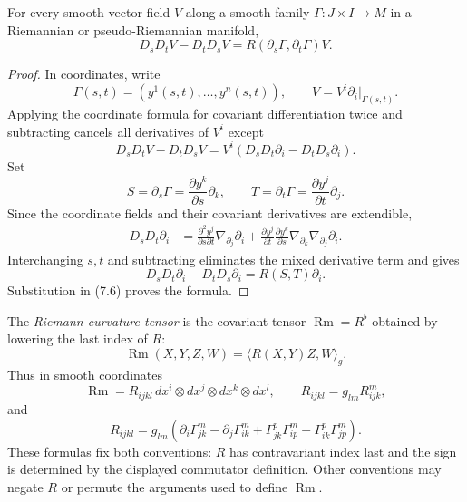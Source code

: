 \begin{proposition}
\label{prop:curvature-commutator-failure}

For every smooth vector field $V$ along a smooth family
$\Gamma\colon J\times I\to M$ in a Riemannian or pseudo-Riemannian manifold,
\[
D_sD_tV-D_tD_sV=R(\partial_s\Gamma,\partial_t\Gamma)V.
\]
\end{proposition}

\begin{proof}
\sketch In coordinates, write
\[
\Gamma(s,t)=(y^1(s,t),\ldots,y^n(s,t)),
\qquad V=V^i\partial_i|_{\Gamma(s,t)}.
\]
Applying the coordinate formula for covariant differentiation twice and
subtracting cancels all derivatives of $V^i$ except
\begin{equation}
D_sD_tV-D_tD_sV
=V^i(D_sD_t\partial_i-D_tD_s\partial_i). \tag{7.6}
\end{equation}
Set
\[
S=\partial_s\Gamma=\frac{\partial y^k}{\partial s}\partial_k,
\qquad
T=\partial_t\Gamma=\frac{\partial y^j}{\partial t}\partial_j.
\]
Since the coordinate fields and their covariant derivatives are extendible,
\begin{align*}
D_sD_t\partial_i
&=\frac{\partial^2y^j}{\partial s\partial t}
  \nabla_{\partial_j}\partial_i
 +\frac{\partial y^j}{\partial t}
  \frac{\partial y^k}{\partial s}
  \nabla_{\partial_k}\nabla_{\partial_j}\partial_i.
\end{align*}
Interchanging $s,t$ and subtracting eliminates the mixed derivative term and
gives
\[
D_sD_t\partial_i-D_tD_s\partial_i
=R(S,T)\partial_i.
\]
Substitution in (7.6) proves the formula.
\end{proof}

The \emph{Riemann curvature tensor} is the covariant tensor
$\operatorname{Rm}=R^\flat$ obtained by lowering the last index of $R$:
\begin{equation}
\operatorname{Rm}(X,Y,Z,W)=\langle R(X,Y)Z,W\rangle_g. \tag{7.7}
\end{equation}
Thus in smooth coordinates
\[
\operatorname{Rm}=R_{ijkl}\,dx^i\otimes dx^j\otimes dx^k\otimes dx^l,
\qquad R_{ijkl}=g_{lm}R_{ijk}^m,
\]
and
\begin{equation}
R_{ijkl}=g_{lm}\left(
\partial_i\Gamma_{jk}^m-\partial_j\Gamma_{ik}^m
+\Gamma_{jk}^p\Gamma_{ip}^m-\Gamma_{ik}^p\Gamma_{jp}^m
\right). \tag{7.8}
\end{equation}
These formulas fix both conventions: $R$ has contravariant index last and the
sign is determined by the displayed commutator definition. Other conventions
may negate $R$ or permute the arguments used to define $\operatorname{Rm}$.

